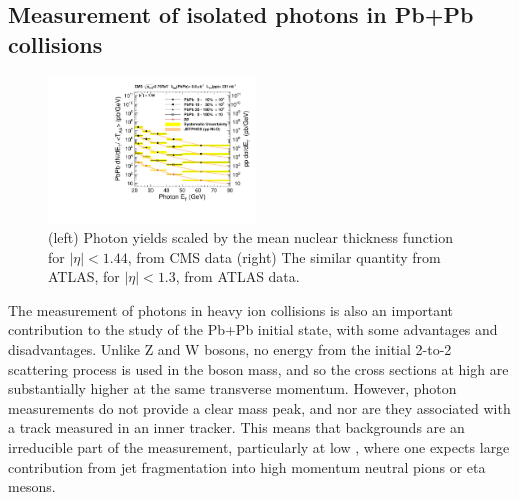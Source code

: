 \subsection{Measurement of isolated photons in Pb+Pb collisions}

\begin{figure}[!htb]
\begin{center}
\includegraphics[width=0.49\textwidth]{electroweak_figs/TAAScaling.pdf}
\caption[]{(left) Photon yields scaled by the mean nuclear thickness function for $|\eta|<1.44$, from CMS data (right) The similar quantity from ATLAS, for $|\eta|<1.3$, from ATLAS data.}
\label{fig:pas:zw}
\end{center}
\end{figure}

The measurement of photons in heavy ion collisions is also an important contribution to the
study of the Pb+Pb initial state, with some advantages and disadvantages.  Unlike Z and W bosons, 
no energy from the initial 2-to-2 scattering process is used in the boson mass, 
and so the cross sections at high \pT are substantially higher at the same transverse momentum.
However, photon measurements do not provide a clear mass peak, and nor are they associated with
a track measured in an inner tracker.  This means that backgrounds are an irreducible part of
the measurement, particularly at low \pT, where one expects large contribution from jet fragmentation
into high momentum neutral pions or eta mesons.


